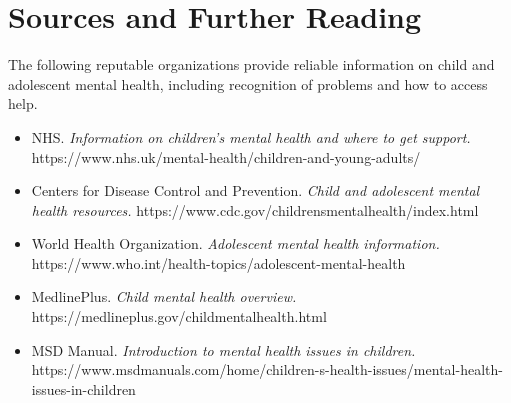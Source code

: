 \section*{Sources and Further Reading}
The following reputable organizations provide reliable information on child and adolescent mental health, including recognition of problems and how to access help.
\begin{itemize}
    \item NHS. \textit{Information on children's mental health and where to get support.} https://www.nhs.uk/mental-health/children-and-young-adults/
    \item Centers for Disease Control and Prevention. \textit{Child and adolescent mental health resources.} https://www.cdc.gov/childrensmentalhealth/index.html
    \item World Health Organization. \textit{Adolescent mental health information.} https://www.who.int/health-topics/adolescent-mental-health
    \item MedlinePlus. \textit{Child mental health overview.} https://medlineplus.gov/childmentalhealth.html
    \item MSD Manual. \textit{Introduction to mental health issues in children.} https://www.msdmanuals.com/home/children-s-health-issues/mental-health-issues-in-children
\end{itemize}
